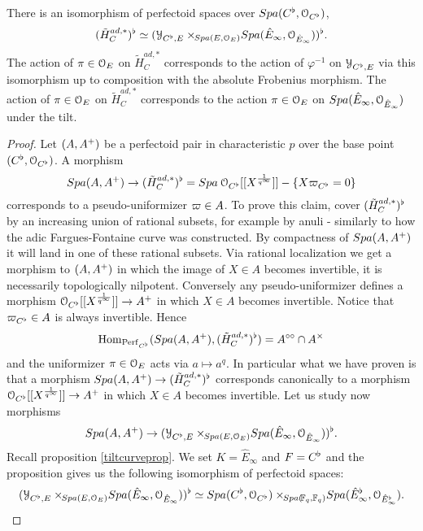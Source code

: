 \begin{prop}\label{tiltmainprop}
There is an isomorphism of perfectoid spaces over ${Spa({C^{\flat}},{\mathcal{O}_{C^{\flat}}})}$,
\[(\tilde{H}^{ad, *}_{C})^{\flat}\simeq(\mathcal{Y}_{C^{\flat},E}\times\!\!_{{Spa({E},{\mathcal{O}_E})}}{Spa({\hat{E}_{\infty}},{\mathcal{O}_{\hat{E}_{\infty}}})})^{\flat}.\]
The action of $\pi\in\mathcal{O}_E$ on $\tilde{H}^{ad, *}_{C}$ corresponds to the action of $\varphi^{-1}$ on 
$\mathcal{Y}_{C^{\flat},E}$ via this isomorphism up to composition with the absolute Frobenius morphism. The action of $\pi\in\mathcal{O}_E$ on $\tilde{H}^{ad, *}_{C}$ corresponds to the action $\pi\in\mathcal{O}_E$ on ${Spa({\hat{E}_{\infty}},{\mathcal{O}_{\hat{E}_{\infty}}})}$ under the tilt.
\end{prop}
\begin{proof}
Let $(A, A{^{+}})$ be a perfectoid pair in characteristic $p$ over the base point $(C^{\flat}, \mathcal{O}_{C^{\flat}})$. A morphism
$${Spa({A},{A{^{+}}})}\to (\tilde{H}^{ad, *}_{C})^{\flat} = {Spa{\:\mathcal{O}_{C^{\flat}}[[X^{\frac{1}{q^\infty}}]]}}-\{X\varpi_{C^{\flat}}=0\}$$
corresponds to a pseudo-uniformizer $\varpi\in A$. To prove this claim, cover $(\tilde{H}^{ad, *}_{C})^{\flat}$
by an increasing union of rational subsets, for example by anuli - similarly to how the adic Fargues-Fontaine curve was constructed. By compactness of ${Spa({A},{A{^{+}}})}$ it will land in one of these rational subsets. Via rational localization we get a morphism to $(A, A{^{+}})$
in which the image of $X\in A$ becomes invertible, it is necessarily topologically nilpotent. Conversely any pseudo-uniformizer defines a morphism
$\mathcal{O}_{C^{\flat}}[[X^{\frac{1}{q^\infty}}]]\to A{^{+}}$ in which $X\in A$ becomes invertible. Notice that $\varpi_{C^{\flat}}\in A$ is always invertible.
Hence 
$${\rm{Hom}}_{\mathrm{Perf}_{C^{\flat}}}({Spa({A},{A{^{+}}})}, (\tilde{H}^{ad, *}_{C})^{\flat}) = A^{\circ\circ}\cap A^{\times}$$ 
and the uniformizer $\pi\in\mathcal{O}_E$ acts via $a\mapsto a^q$. In particular what we have proven is that a morphism 
${Spa({A},{A{^{+}}})}\to (\tilde{H}^{ad, *}_{C})^{\flat}$ corresponds canonically to a morphism $\mathcal{O}_{C^{\flat}}[[X^{\frac{1}{q^\infty}}]]\to A{^{+}}$ in which $X\in A$ becomes invertible.
Let us study now morphisms 
$${Spa({A},{A{^{+}}})}\to (\mathcal{Y}_{C^{\flat},E}\times\!\!_{{Spa({E},{\mathcal{O}_E})}}{Spa({\hat{E}_{\infty}},{\mathcal{O}_{\hat{E}_{\infty}}})})^{\flat}.$$
Recall proposition \ref{tiltcurveprop}. We set $K=\hat{E}_{\infty}$ and $F=C^{\flat}$ and the proposition gives us the following isomorphism of perfectoid spaces:
\[(\mathcal{Y}_{C^{\flat},E}\times\!\!_{{Spa({E},{\mathcal{O}_E})}}{Spa({\hat{E}_{\infty}},{\mathcal{O}_{\hat{E}_{\infty}}})})^{\flat}\simeq {Spa({C^{\flat}},{\mathcal{O}_{C^{\flat}}})}\times\!\!_{{Spa({\!\mathbb{F}_q},{\mathbb{F}_q})}}{Spa({\hat{E}_{\infty}^{\flat}},{\mathcal{O}_{\hat{E}_{\infty}^{\flat}}})}.\]

\end{proof}
